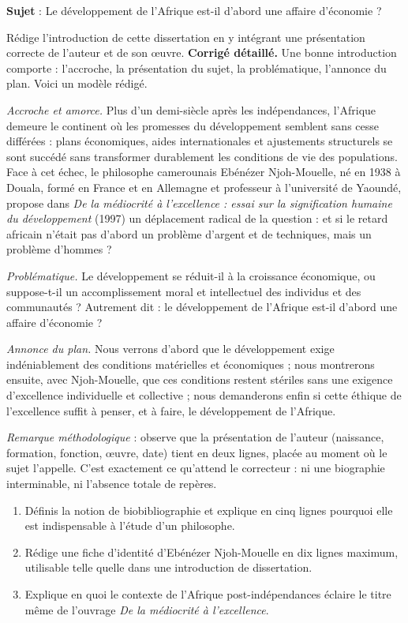 \documentclass[11pt]{article}
\begin{document}
\begin{exoresolu}
\textbf{Sujet} : Le développement de l'Afrique est-il d'abord une affaire d'économie ?

Rédige l'introduction de cette dissertation en y intégrant une présentation correcte de l'auteur et de son œuvre.
\tcblower
\textbf{Corrigé détaillé.} Une bonne introduction comporte : l'accroche, la présentation du sujet, la problématique, l'annonce du plan. Voici un modèle rédigé.

\emph{Accroche et amorce.} Plus d'un demi-siècle après les indépendances, l'Afrique demeure le continent où les promesses du développement semblent sans cesse différées : plans économiques, aides internationales et ajustements structurels se sont succédé sans transformer durablement les conditions de vie des populations. Face à cet échec, le philosophe camerounais Ebénézer Njoh-Mouelle, né en 1938 à Douala, formé en France et en Allemagne et professeur à l'université de Yaoundé, propose dans \emph{De la médiocrité à l'excellence : essai sur la signification humaine du développement} (1997) un déplacement radical de la question : et si le retard africain n'était pas d'abord un problème d'argent et de techniques, mais un problème d'hommes ?

\emph{Problématique.} Le développement se réduit-il à la croissance économique, ou suppose-t-il un accomplissement moral et intellectuel des individus et des communautés ? Autrement dit : le développement de l'Afrique est-il d'abord une affaire d'économie ?

\emph{Annonce du plan.} Nous verrons d'abord que le développement exige indéniablement des conditions matérielles et économiques ; nous montrerons ensuite, avec Njoh-Mouelle, que ces conditions restent stériles sans une exigence d'excellence individuelle et collective ; nous demanderons enfin si cette éthique de l'excellence suffit à penser, et à faire, le développement de l'Afrique.

\emph{Remarque méthodologique} : observe que la présentation de l'auteur (naissance, formation, fonction, œuvre, date) tient en deux lignes, placée au moment où le sujet l'appelle. C'est exactement ce qu'attend le correcteur : ni une biographie interminable, ni l'absence totale de repères.
\end{exoresolu}

\begin{exercice}
\begin{enumerate}
\item Définis la notion de biobibliographie et explique en cinq lignes pourquoi elle est indispensable à l'étude d'un philosophe.
\item Rédige une fiche d'identité d'Ebénézer Njoh-Mouelle en dix lignes maximum, utilisable telle quelle dans une introduction de dissertation.
\item Explique en quoi le contexte de l'Afrique post-indépendances éclaire le titre même de l'ouvrage \emph{De la médiocrité à l'excellence}.
\end{enumerate}
\end{exercice}
\end{document}
